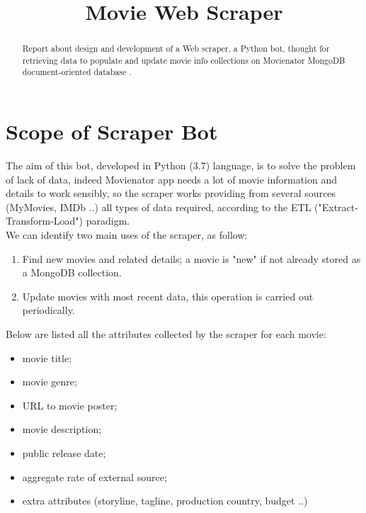 \documentclass[11pt]{article}
\begin{document}
\title{Movie Web Scraper}
\date{}
\maketitle
\begin{abstract}\noindent Report about design and development of a Web scraper, a Python bot, thought for retrieving data to populate and update movie info collections on Movienator MongoDB document-oriented database . 

\end{abstract}



\section{Scope of Scraper Bot}
The aim of this bot, developed in Python (3.7) language, is to solve the problem of lack of data, indeed Movienator app needs a lot of movie information and details to work sensibly, so the scraper works providing from several sources (MyMovies, IMDb ..) all types of data required, according to the ETL ("Extract-Transform-Load") paradigm.\\\newline
We can identify two main uses of the scraper, as follow:
\begin{enumerate}
    \item Find new movies and related details; a movie is "new" if not already stored as a MongoDB collection.
    \item Update movies with most recent data, this operation is carried out periodically.
\end{enumerate}
Below are listed all the attributes collected by the scraper for each movie:\newline
\begin{itemize}
    \item movie title;
    \item movie genre;
    \item URL to movie poster;
    \item movie description;
    \item public release date;
    \item aggregate rate of external source;
    \item extra attributes (storyline, tagline, production country, budget ..)
\end{itemize}
\end{document}
